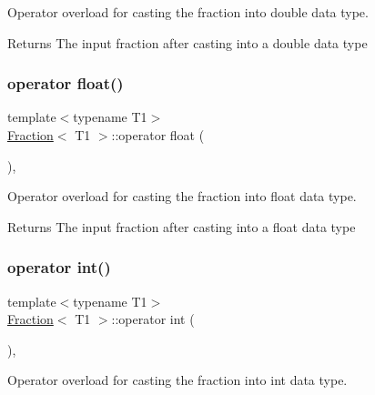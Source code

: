 Operator overload for casting the fraction into double data type. 

\begin{DoxyReturn}{Returns}
The input fraction after casting into a double data type 
\end{DoxyReturn}
\mbox{\label{class_fraction_a8bdec9c82794a4f0ccaab7f8ba0a29b7}} 
\subsubsection{\texorpdfstring{operator float()}{operator float()}}
{\footnotesize\ttfamily template$<$typename T1$>$ \\
\mbox{\hyperlink{class_fraction}{Fraction}}$<$ T1 $>$\+::operator float (\begin{DoxyParamCaption}{ }\end{DoxyParamCaption})\hspace{0.3cm}{\ttfamily [inline]}, {\ttfamily [explicit]}}



Operator overload for casting the fraction into float data type. 

\begin{DoxyReturn}{Returns}
The input fraction after casting into a float data type 
\end{DoxyReturn}
\mbox{\label{class_fraction_a26e703ee017465f51b0327a51936dc81}} 
\subsubsection{\texorpdfstring{operator int()}{operator int()}}
{\footnotesize\ttfamily template$<$typename T1$>$ \\
\mbox{\hyperlink{class_fraction}{Fraction}}$<$ T1 $>$\+::operator int (\begin{DoxyParamCaption}{ }\end{DoxyParamCaption})\hspace{0.3cm}{\ttfamily [inline]}, {\ttfamily [explicit]}}



Operator overload for casting the fraction into int data type. 

